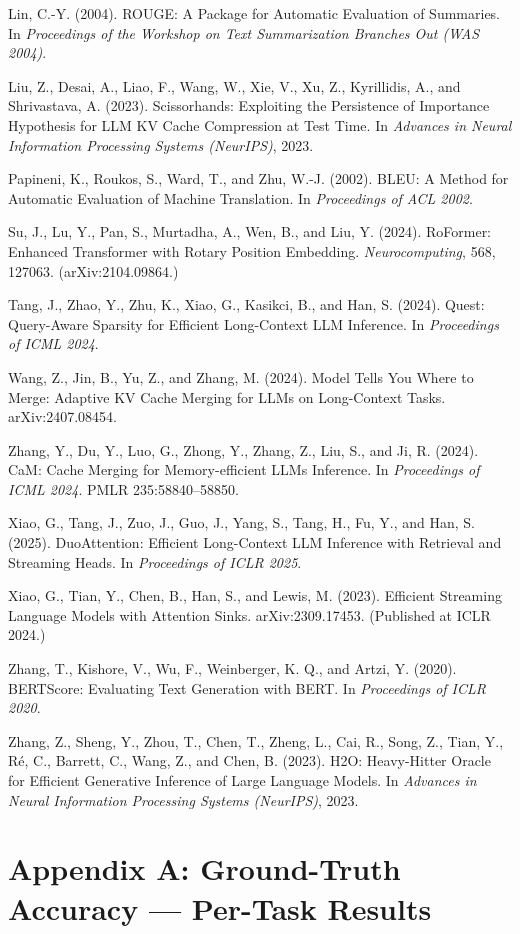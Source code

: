 \documentclass[10pt,letterpaper]{article}
\begin{document}
Lin, C.-Y. (2004). ROUGE: A Package for Automatic Evaluation of
Summaries. In \emph{Proceedings of the Workshop on Text Summarization
Branches Out (WAS 2004)}.

Liu, Z., Desai, A., Liao, F., Wang, W., Xie, V., Xu, Z., Kyrillidis, A.,
and Shrivastava, A. (2023). Scissorhands: Exploiting the Persistence of
Importance Hypothesis for LLM KV Cache Compression at Test Time. In
\emph{Advances in Neural Information Processing Systems (NeurIPS)},
2023.

Papineni, K., Roukos, S., Ward, T., and Zhu, W.-J. (2002). BLEU: A
Method for Automatic Evaluation of Machine Translation. In
\emph{Proceedings of ACL 2002}.

Su, J., Lu, Y., Pan, S., Murtadha, A., Wen, B., and Liu, Y. (2024).
RoFormer: Enhanced Transformer with Rotary Position Embedding.
\emph{Neurocomputing}, 568, 127063. (arXiv:2104.09864.)

Tang, J., Zhao, Y., Zhu, K., Xiao, G., Kasikci, B., and Han, S. (2024).
Quest: Query-Aware Sparsity for Efficient Long-Context LLM Inference. In
\emph{Proceedings of ICML 2024}.

Wang, Z., Jin, B., Yu, Z., and Zhang, M. (2024). Model Tells You Where
to Merge: Adaptive KV Cache Merging for LLMs on Long-Context Tasks.
arXiv:2407.08454.

Zhang, Y., Du, Y., Luo, G., Zhong, Y., Zhang, Z., Liu, S., and Ji, R.
(2024). CaM: Cache Merging for Memory-efficient LLMs Inference. In
\emph{Proceedings of ICML 2024}. PMLR 235:58840--58850.

Xiao, G., Tang, J., Zuo, J., Guo, J., Yang, S., Tang, H., Fu, Y., and
Han, S. (2025). DuoAttention: Efficient Long-Context LLM Inference with
Retrieval and Streaming Heads. In \emph{Proceedings of ICLR 2025}.

Xiao, G., Tian, Y., Chen, B., Han, S., and Lewis, M. (2023). Efficient
Streaming Language Models with Attention Sinks. arXiv:2309.17453.
(Published at ICLR 2024.)

Zhang, T., Kishore, V., Wu, F., Weinberger, K. Q., and Artzi, Y. (2020).
BERTScore: Evaluating Text Generation with BERT. In \emph{Proceedings of
ICLR 2020}.

Zhang, Z., Sheng, Y., Zhou, T., Chen, T., Zheng, L., Cai, R., Song, Z.,
Tian, Y., Ré, C., Barrett, C., Wang, Z., and Chen, B. (2023). H2O:
Heavy-Hitter Oracle for Efficient Generative Inference of Large Language
Models. In \emph{Advances in Neural Information Processing Systems
(NeurIPS)}, 2023.


\clearpage
\hypertarget{appendix-b-ground-truth-accuracy-per-task-results}{%
\section{Appendix A: Ground-Truth Accuracy --- Per-Task
Results}\label{appendix-a-ground-truth-accuracy-per-task-results}}
\end{document}
